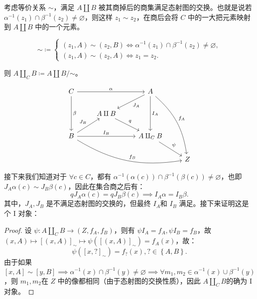 \begin{itemize}
          考虑等价关系 \(\sim\)，满足 \(A\amalg B\) 被其商掉后的商集满足态射图的交换。也就是说若 \(\alpha ^{-1}(z_1) \cap \beta ^{-1} (z_2) \neq \varnothing\)，则这样 \(z_1\sim z_2\)，在商后会将 \(C\) 中的一大把元素映射到 \(A\amalg B\) 中的一个元素。

          \[
              \sim\coloneqq  \begin{cases}
                  (z_1,A)\sim(z_2,B)\iff \alpha ^{-1}(z_1) \cap \beta ^{-1} (z_2) \neq \varnothing, \\
                  (z_1,A)\sim(z_2,A)\iff z_1=z_2.
              \end{cases}
          \]

          则 \(A\amalg _CB\coloneqq A\amalg B /\mathord \sim\)。

          \[
              \begin{tikzcd}
                  C\arrow[rr, "\alpha "]\arrow[dd, "\beta "]                               & {}                       & A\arrow[ld, "J_A"]\arrow[dd, "I_A"]\arrow[rddd, "f_A", bend left = 20] & {} \\
                  {}                                                                       & A\amalg B\arrow[rd, "q"] & {}                                                                     & {} \\
                  B\arrow[ru, "J_B"]\arrow[rr, "I_B"]\arrow[rrrd, "f_B",  bend left = -20] & {}                       & {}  A\amalg _CB\arrow[rd, "\psi "]                                     & {} \\
                  {}                                                                       & {}                       & {}                                                                     & Z
              \end{tikzcd}
          \]
          接下来我们知道对于 \(\forall c\in C\)，都有 \(\alpha ^{-1} (\alpha (c))\cap\beta^{-1} (\beta(c))\neq \varnothing\)，也即 \(J_A\alpha (c)\sim J_B \beta (c)\)，因此在集合商之后有：
          \[
              qJ_A\alpha (c)= qJ_B \beta (c) \implies I_A\alpha = I_B \beta
              .\]
          其中，\(J_A,J_B\) 是不满足态射图的交换的，但最终 \(I_A \)和 \(I_B\) 满足。接下来证明这是个 I 对象：
          \begin{proof}{}
              设 \(\psi :A\amalg _CB\to (Z,f_A,f_B)\)，则有 \(\psi I_A = f_A, \psi I_B = f_B\)，故 \((x,A)\mapsto [(x,A)]_{\sim} \mapsto \psi \left(  [(x,A)]_{\sim}\right) =f_A(x)\)，故：
              \[
                  \psi \left( [x,?]_{\sim} \right) = f_?(x) ,?\in\left\{ A,B \right\}
                  .\]
              由于如果 \([x,A]\sim[y,B] \implies  \alpha ^{-1}(x) \cap \beta ^{-1} (y) \neq \varnothing \implies\forall m_1,m_2\in\alpha ^{-1}(x) \cup \beta ^{-1} (y)\)，则 \(m_1,m_2\)在 \(Z\) 中的像都相同（由于态射图的交换性质），因此 \(A\amalg _CB\)的确为 I 对象。


\end{proof}
\end{itemize}
